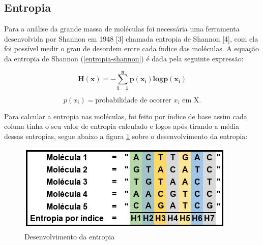 \subsection{Entropia}

Para a análise da grande massa de moléculas foi necessária uma ferramenta
desenvolvida por Shannon em 1948 [3] chamada entropia de Shannon [4], com ela foi
possível medir o grau de desordem entre cada índice das moléculas. A equação da entropia de
Shannon (\ref{entropia-shannon}) é dada pela seguinte expressão:

\begin{equation}
    \label{entropia-shannon}
    \mathbf{H(x) = -\sum\limits_{i=1}^{n}p(x_i)log p(x_i)}
\end{equation}

$$p(x_i)=\text{probabilidade de ocorrer } x_i\text{ em X.}$$

Para calcular a entropia nas moléculas, foi feito por índice de base assim cada
coluna tinha o seu valor de entropia calculado e logos após tirando a média dessas
entropias, segue abaixo a figura \ref{fig:example-entropia} sobre o desenvolvimento da entropia:

\begin{figure}[!h]
    \centering
    \includegraphics[scale=0.7]{figures/img-entropia.png}
    \caption{Desenvolvimento da entropia}
    \label{fig:example-entropia}
\end{figure}